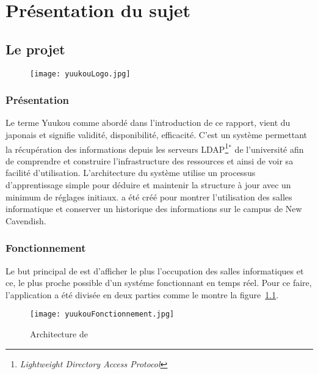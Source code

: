 \chapter{Pr\'esentation du sujet}

\section{Le projet \Yuukou}

\begin{figure}[!ht]
	\centering
	\texttt{[image: yuukouLogo.jpg]}

\end{figure}

\subsection{Pr\'esentation}

Le terme Yuukou comme abord\'e dans l'introduction de ce rapport, vient du japonais \Yuukou{} et signifie validit\'e, disponibilit\'e, efficacit\'e.
C'est un syst\`eme permettant la r\'ecup\'eration des informations depuis les serveurs LDAP\protect\footnote{\textit{Lightweight Directory Access Protocol}}$^*$ de l'universit\'e afin de comprendre et construire l'infrastructure des ressources et ainsi de voir sa facilit\'e d'utilisation. 
L'architecture du syst\`eme utilise un processus d'apprentissage simple pour d\'eduire et maintenir la structure \`a jour avec un minimum de r\'eglages initiaux.
\Yuukou{} a \'et\'e cr\'e\'e pour montrer l'utilisation des salles informatique et conserver un historique des informations sur le campus de New Cavendish.

\subsection{Fonctionnement}

Le but principal de \Yuukou{} est d'afficher le plus l'occupation des salles informatiques et ce, le plus proche possible d'un syst\'eme fonctionnant en temps r\'eel.
Pour ce faire, l'application a \'et\'e divis\'ee en deux parties  comme le montre la figure~\ref{figure:yuukouFonctionnement}.

\clearpage

\begin{figure}[!ht]
	\centering
	\texttt{[image: yuukouFonctionnement.jpg]}
	\caption{Architecture de \Yuukou}
	\label{figure:yuukouFonctionnement}

\end{figure}

